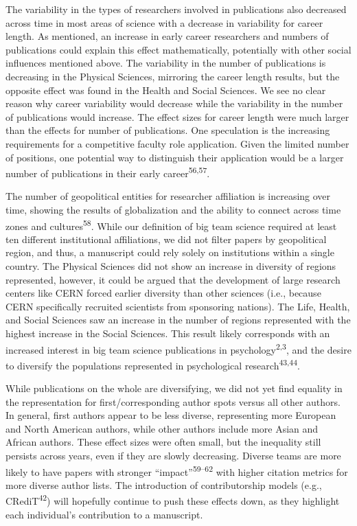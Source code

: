 \documentclass[
  man,floatsintext]{apa6}
\begin{document}
The variability in the types of researchers involved in publications
also decreased across time in most areas of science with a decrease in
variability for career length. As mentioned, an increase in early career
researchers and numbers of publications could explain this effect
mathematically, potentially with other social influences mentioned
above. The variability in the number of publications is decreasing in
the Physical Sciences, mirroring the career length results, but the
opposite effect was found in the Health and Social Sciences. We see no
clear reason why career variability would decrease while the variability
in the number of publications would increase. The effect sizes for
career length were much larger than the effects for number of
publications. One speculation is the increasing requirements for a
competitive faculty role application. Given the limited number of
positions, one potential way to distinguish their application would be a
larger number of publications in their early career\textsuperscript{56,57}.

The number of geopolitical entities for researcher affiliation is
increasing over time, showing the results of globalization and the
ability to connect across time zones and cultures\textsuperscript{58}. While our
definition of big team science required at least ten different
institutional affiliations, we did not filter papers by geopolitical
region, and thus, a manuscript could rely solely on institutions within
a single country. The Physical Sciences did not show an increase in
diversity of regions represented, however, it could be argued that the
development of large research centers like CERN forced earlier diversity
than other sciences (i.e., because CERN specifically recruited
scientists from sponsoring nations). The Life, Health, and Social
Sciences saw an increase in the number of regions represented with the
highest increase in the Social Sciences. This result likely corresponds
with an increased interest in big team science publications in
psychology\textsuperscript{2,3}, and the desire to diversify the
populations represented in psychological research\textsuperscript{43,44}.

While publications on the whole are diversifying, we did not yet find
equality in the representation for first/corresponding author spots
versus all other authors. In general, first authors appear to be less
diverse, representing more European and North American authors, while
other authors include more Asian and African authors. These effect sizes
were often small, but the inequality still persists across years, even
if they are slowly decreasing. Diverse teams are more likely to have
papers with stronger ``impact''\textsuperscript{59--62} with higher citation metrics for more diverse author lists.
The introduction of contributorship models (e.g., CRediT\textsuperscript{42})
will hopefully continue to push these effects down, as they highlight
each individual's contribution to a manuscript.
\end{document}
